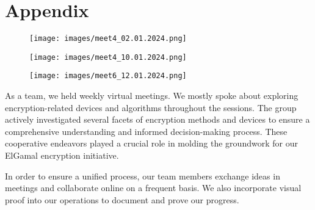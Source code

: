 \documentclass[12pt]{article}
\begin{document}


	\newpage
	\section{Appendix}
	\begin{figure}[H]
	\centering
	\label{Meeting4}
	\texttt{[image: images/meet4\_02.01.2024.png]}\\[0.5 cm]
				
\end{figure}
	\begin{figure}[H]
	\centering
	\label{Meeting5}
	\texttt{[image: images/meet4\_10.01.2024.png]}\\[0.5 cm]			
\end{figure}
	\begin{figure}[H]
	\centering
	\label{Meeting3}
	\texttt{[image: images/meet6\_12.01.2024.png]}\\[0.5 cm]			
\end{figure}


As a team, we held weekly virtual meetings. We mostly spoke about exploring encryption-related devices and algorithms throughout the sessions. The group actively investigated several facets of encryption methods and devices to ensure a comprehensive understanding and informed decision-making process. These cooperative endeavors played a crucial role in molding the groundwork for our ElGamal encryption initiative.

	In order to ensure a unified process, our team members exchange ideas in meetings and collaborate online on a frequent basis. We also incorporate visual proof into our operations to document and prove our progress.
\end{document}

